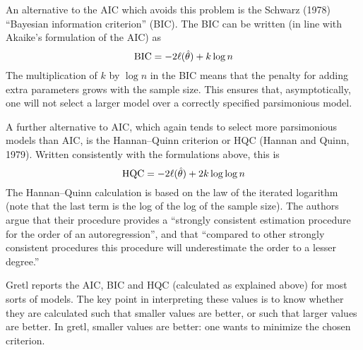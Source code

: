 An alternative to the AIC which avoids this problem is the Schwarz
(1978) ``Bayesian information criterion'' (BIC).  The BIC can be
written (in line with Akaike's formulation of the AIC) as
%
\[
{\rm BIC} = -2 \ell(\hat{\theta}) + k \log n
\]
The multiplication of $k$ by $\log n$ in the BIC means that the
penalty for adding extra parameters grows with the sample size.  This
ensures that, asymptotically, one will not select a larger model over
a correctly specified parsimonious model.

A further alternative to AIC, which again tends to select more
parsimonious models than AIC, is the Hannan--Quinn criterion or HQC
(Hannan and Quinn, 1979).  Written consistently with the formulations
above, this is
%
\[
{\rm HQC} = -2 \ell(\hat{\theta}) + 2k \log \log n
\]
%
The Hannan--Quinn calculation is based on the law of the iterated
logarithm (note that the last term is the log of the log of the sample
size).  The authors argue that their procedure provides a ``strongly
consistent estimation procedure for the order of an autoregression'',
and that ``compared to other strongly consistent procedures this
procedure will underestimate the order to a lesser degree.''

\vspace{1ex}

Gretl reports the AIC, BIC and HQC (calculated as explained above) for
most sorts of models.  The key point in interpreting these values is
to know whether they are calculated such that smaller values are
better, or such that larger values are better.  In gretl, smaller
values are better: one wants to minimize the chosen criterion.





